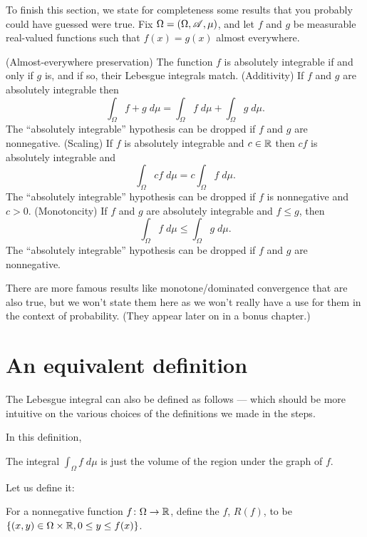To finish this section, we state for completeness
some results that you probably could have guessed were true.
Fix $\Omega = (\Omega, \mathscr A, \mu)$, and
let $f$ and $g$ be measurable real-valued functions
such that $f(x) = g(x)$ almost everywhere.
\begin{itemize}
	\ii (Almost-everywhere preservation)
	The function $f$ is absolutely integrable if and only if $g$ is,
	and if so, their Lebesgue integrals match.
	\ii (Additivity)
	If $f$ and $g$ are absolutely integrable then
	\[ \int_\Omega f+g \; d\mu
		= \int_\Omega f \; d\mu
		+ \int_\Omega g \; d\mu. \]
	The ``absolutely integrable'' hypothesis can be dropped
	if $f$ and $g$ are nonnegative.
	\ii (Scaling) If $f$ is absolutely integrable and $c \in \mathbb R$
	then $cf$ is absolutely integrable and
	\[ \int_\Omega cf \; d\mu = c \int_\Omega f \; d\mu. \]
	The ``absolutely integrable'' hypothesis can be dropped
	if $f$ is nonnegative and $c > 0$.
	\ii (Monotoncity)
	If $f$ and $g$ are absolutely integrable and $f \le g$, then
	\[ \int_\Omega f \; d\mu \le \int_\Omega g \; d\mu. \]
	The ``absolutely integrable'' hypothesis can be dropped
	if $f$ and $g$ are nonnegative.
\end{itemize}
There are more famous results like monotone/dominated convergence
that are also true, but we won't state them here
as we won't really have a use for them in the context of probability.
(They appear later on in a bonus chapter.)

\section{An equivalent definition}
\label{sec:lebesgue_int_equivalent_def}

The Lebesgue integral can also be defined as follows --- which should be more intuitive on the various
choices of the definitions we made in the steps.

In this definition,
\begin{moral}
	The integral $\int_\Omega f \; d\mu$ is just the volume of the region under the graph of $f$.
\end{moral}

Let us define it:
\setcounter{step}{0}
\begin{step}
	For a nonnegative function $f \colon \Omega \to \mathbb R$, define the 
	$f$, $R(f)$, to be $\{(x, y) \in \Omega \times \mathbb R, 0 \leq y \leq f(x)\}$.
\end{step}

